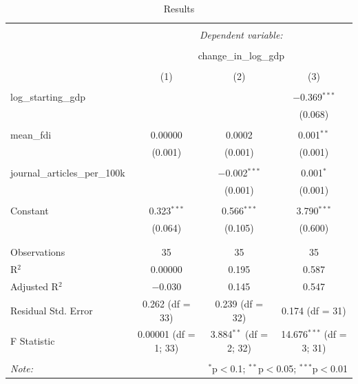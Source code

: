 \documentclass{article}
\begin{document}
\begin{table}[!htbp] \centering 
  \caption{Results} 
  \label{} 
\begin{tabular}{@{\extracolsep{5pt}}lccc} 
\\[-1.8ex]\hline 
\hline \\[-1.8ex] 
 & \multicolumn{3}{c}{\textit{Dependent variable:}} \\ 
\cline{2-4} 
\\[-1.8ex] & \multicolumn{3}{c}{change\_in\_log\_gdp} \\ 
\\[-1.8ex] & (1) & (2) & (3)\\ 
\hline \\[-1.8ex] 
 log\_starting\_gdp &  &  & $-$0.369$^{***}$ \\ 
  &  &  & (0.068) \\ 
  & & & \\ 
 mean\_fdi & 0.00000 & 0.0002 & 0.001$^{**}$ \\ 
  & (0.001) & (0.001) & (0.001) \\ 
  & & & \\ 
 journal\_articles\_per\_100k &  & $-$0.002$^{***}$ & 0.001$^{*}$ \\ 
  &  & (0.001) & (0.001) \\ 
  & & & \\ 
 Constant & 0.323$^{***}$ & 0.566$^{***}$ & 3.790$^{***}$ \\ 
  & (0.064) & (0.105) & (0.600) \\ 
  & & & \\ 
\hline \\[-1.8ex] 
Observations & 35 & 35 & 35 \\ 
R$^{2}$ & 0.00000 & 0.195 & 0.587 \\ 
Adjusted R$^{2}$ & $-$0.030 & 0.145 & 0.547 \\ 
Residual Std. Error & 0.262 (df = 33) & 0.239 (df = 32) & 0.174 (df = 31) \\ 
F Statistic & 0.00001 (df = 1; 33) & 3.884$^{**}$ (df = 2; 32) & 14.676$^{***}$ (df = 3; 31) \\ 
\hline 
\hline \\[-1.8ex] 
\textit{Note:}  & \multicolumn{3}{r}{$^{*}$p$<$0.1; $^{**}$p$<$0.05; $^{***}$p$<$0.01} \\ 
\end{tabular} 
\end{table} 
\newpage
\end{document}
